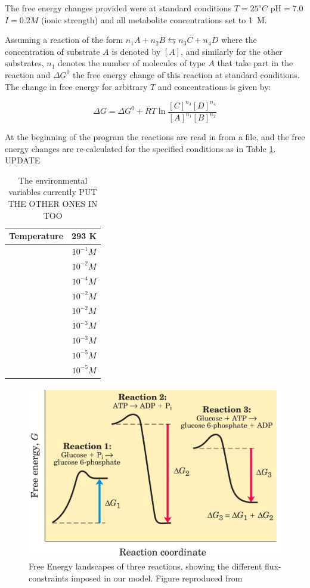 \documentclass[10pt,a4paper]{article}
\begin{document}
	The free energy changes provided were at standard conditions $T=25  ^o C$ pH$=7.0$ $I=0.2 M$ (ionic strength) and all metabolite concentrations set to 1~M.
	
	Assuming a reaction of the form $n_1A + n_2B \leftrightarrows n_3C + n_4D$ where the concentration of substrate $A$ is denoted by $[A]$, and similarly for the other substrates, $n_1$ denotes the number of molecules of type $A$ that take part in the reaction and  $\Delta G^0$  the free energy change of this reaction at standard conditions. The change in free energy for arbitrary $T$ and concentrations is given by: 
	
	\begin{equation}\label{eq:freeechange}
		\Delta G = \Delta G^0 + R T \ln \frac{[C]^{n_3}[D]^{n_4}}{[A]^{n_1}[B]^{n_2}}
	\end{equation}
	
	At the beginning of the program the reactions are read in from a file, and the free energy changes are re-calculated for the specified conditions as in Table \ref{environmentTable}. UPDATE
	
	\begin{table}
		\centering
	\begin{tabular}{|c|c|}
		
		\hline Temperature & 293 K \\ 
		\hline [ATP] & $10^{-1} M$ \\ 
		\hline [ADP] & $10^{-2} M$ \\ 
		\hline [AMP] & $10^{-4} M$ \\ 
		\hline [NAD] & $10^{-2} M$ \\ 
		\hline [NADH] & $10^{-2} M$ \\ 
		\hline [Pi] &  $10^{-3} M$\\ 
		\hline [PPi] & $10^{-3} M$ \\ 
		\hline [CO$_2$] & $10^{-5} M$ \\ 
		\hline [NH$_3$] & $10^{-5} M$ \\ 

		\hline 
	\end{tabular} 
	\caption{The environmental variables currently PUT THE OTHER ONES IN TOO}
	\label{environmentTable}
	\end{table}


	\begin{figure}[htpb]
		\centering
		\includegraphics[width=0.6\linewidth]{freeEchangeFig.png}
		\caption{Free Energy landscapes of three reactions, showing the different flux-constraints imposed in our model. Figure reproduced from \cite{principlesofbio}}
		\label{fig:freeEchangeFig}
	\end{figure}
\end{document}
